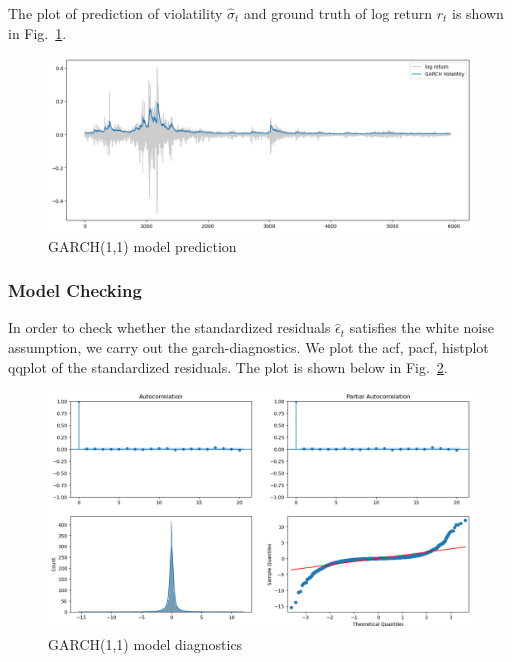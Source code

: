 \documentclass[runningheads]{llncs}
\begin{document}
The plot of prediction of violatility $\hat{\sigma}_t$ and ground truth of log return $r_t$ is shown in Fig.~\ref{fig:10}.


\begin{figure}[htbp]
    \centering
    \includegraphics[width=\textwidth]{../img/garch_train_pred.png}
    \caption{GARCH(1,1) model prediction}
    \label{fig:10}
\end{figure}

\subsubsection{Model Checking}

In order to check whether the standardized residuals $\hat{\epsilon}_t$ satisfies the white noise assumption, we carry out the garch-diagnostics. We plot the acf, pacf, histplot qqplot of the standardized residuals.
The plot is shown below in Fig.~\ref{fig:11}.


\begin{figure}[htbp]
    \centering
    \includegraphics[width=\textwidth]{../img/garch_diagnostics.png}
    \caption{GARCH(1,1) model diagnostics}
    \label{fig:11}
\end{figure}
\end{document}
